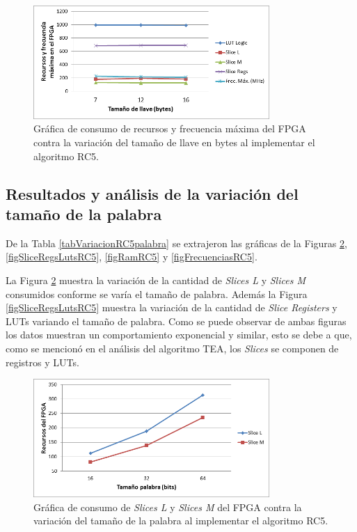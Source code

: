 \begin{figure}[H]
	\centering
	\includegraphics[width=0.8\textwidth]{./images/figLlaveRC5}
	\caption{Gráfica de consumo de recursos y frecuencia máxima del FPGA contra la variación del tamaño de llave en bytes al implementar el algoritmo RC5.}
	\label{figllaveRC5}
\end{figure}


\subsection{Resultados y análisis de la variación del tamaño de la palabra}
De la Tabla \ref{tabVariacionRC5palabra} se extrajeron las gráficas de la Figuras \ref{figSlicesRC5}, \ref{figSliceRegsLutsRC5}, \ref{figRamRC5} y \ref{figFrecuenciasRC5}. 

La Figura \ref{figSlicesRC5} muestra la variación de la cantidad de \textit{Slices L} y \textit{Slices M} consumidos conforme se varía el tamaño de palabra. Además la Figura \ref{figSliceRegsLutsRC5} muestra la variación de la cantidad de \textit{Slice Registers} y LUTs variando el tamaño de palabra. Como se puede observar de ambas figuras los datos muestran un comportamiento exponencial y similar, esto se debe a que, como se mencionó en el análisis del algoritmo TEA, los \textit{Slices} se componen de registros y LUTs.


\begin{figure}[H]
	\centering
	\includegraphics[width=0.8\textwidth]{./images/figSlicesRC5}
	\caption{Gráfica de consumo de \textit{Slices L} y \textit{Slices M} del FPGA contra la variación del tamaño de la palabra al implementar el algoritmo RC5.}
	\label{figSlicesRC5}
\end{figure}

